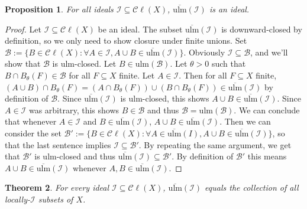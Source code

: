 \documentclass[12pt]{amsart}
\newtheorem{theorem}{Theorem}[section]
\newtheorem{prop}[theorem]{Proposition}
\theoremstyle{definition}
\numberwithin{equation}{section}
\def \B {\mathcal{B}}
\def \I {\mathcal{I}}
\def \sbs {\subseteq}
\newcommand{\Cl}[1]{\mathcal{C}\ell\left(#1\right)}
\newcommand{\ulm}[1]{\mathrm{ulm}\left(#1\right)}
\newcommand{\ulmc}[1]{\overline{\mathrm{ulm}}\left(#1\right)}
\begin{document}
\begin{prop} \label{prop:ulmcideal}
For all ideals $\I \sbs \Cl{X}$, $\ulmc{\I}$ is an ideal.
\end{prop}

\begin{proof}
Let $\I \sbs \Cl{X}$ be an ideal. The subset $\ulmc{\I}$ is downward-closed by definition, so we only need to show closure under finite unions. Set $\B := \{B \in \Cl{X}: \forall A \in \I, A \cup B \in \ulmc{\I}\}$. Obviously $\I \sbs \B$, and we'll show that $\B$ is ulm-closed. Let $B \in \ulm{\B}$. Let $\theta > 0$ such that $B \cap B_\theta(F) \in \B$ for all $F \sbs X$ finite. Let $A \in \I$. Then for all $F \sbs X$ finite, $(A \cup B) \cap B_\theta(F) = (A \cap B_\theta(F)) \cup (B \cap B_\theta(F)) \in \ulmc{\I}$ by definition of $\B$. Since $\ulmc{\I}$ is ulm-closed, this shows $A \cup B \in \ulmc{\I}$. Since $A \in \I$ was arbitrary, this shows $B \in \B$ and thus $\B = \ulm{\B}$. We can conclude that whenever $A \in \I$ and $B \in \ulmc{\I}$, $A \cup B \in \ulmc{\I}$. Then we can consider the set $\B' := \{B \in \Cl{X}: \forall A \in \ulmc{I}, A \cup B \in \ulmc{\I}\}$, so that the last sentence implies $\I \sbs \B'$. By repeating the same argument, we get that $\B'$ is ulm-closed and thus $\ulmc{\I} \sbs \B'$. By definition of $\B'$ this means $A \cup B \in \ulmc{\I}$ whenever $A,B \in \ulmc{\I}$.
\end{proof}

\begin{theorem} \label{thm:ulmclocallyI}
For every ideal $\I \sbs \Cl{X}$, $\ulmc{\I}$ equals the collection of all locally-$\I$ subsets of $X$.
\end{theorem}
\end{document}
